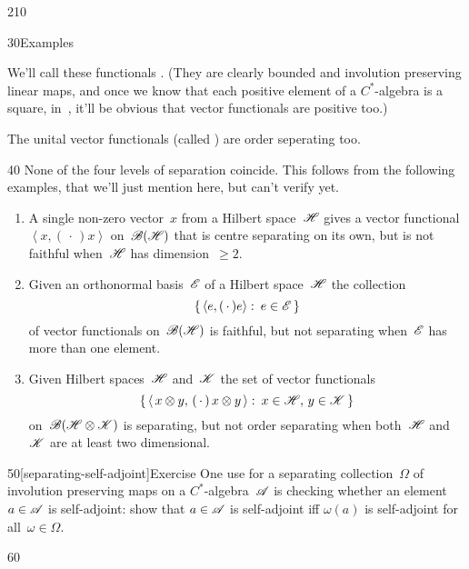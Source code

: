 \begin{parsec}{210}
\begin{point}{30}{Examples}
\begin{enumerate}
We'll call these functionals
%
%
.
(They are clearly bounded
and involution preserving linear maps,
and once we know that each positive element of a $C^*$-algebra
is a square, in~,
it'll be obvious that vector functionals
are positive too.)

The unital vector functionals (called )%
are order seperating too.
\end{enumerate}%
\spacingfix%
\begin{point}{40}
None of the four levels of separation
coincide.
This follows from the following examples,
that we'll just mention here,
but can't verify yet.
\begin{enumerate}
\item
A single non-zero vector~$x$ from a Hilbert space~$\mathscr{H}$
gives a vector functional $\left<x,(\,\cdot\,)x\right>$
on~$\mathscr{B}(\mathscr{H})$ that is centre separating
on its own, but is not faithful when~$\mathscr{H}$ has dimension~$\geq 2$.
\item
Given an orthonormal basis~$\mathscr{E}$
of a Hilbert space~$\mathscr{H}$
		the collection 
\begin{equation*}
	\{\,\left<e,(\,\cdot\,)e\right>\colon\,e\in\mathscr{E}\,\}
\end{equation*}
		of vector functionals on~$\mathscr{B}(\mathscr{H})$
		is faithful, but not separating when~$\mathscr{E}$
		has more than one element.
\item
Given Hilbert spaces~$\mathscr{H}$
and~$\mathscr{K}$
the set of vector functionals
\begin{equation*}
	\{\,\left<\,x\otimes y,\,(\,\cdot\,)\,x\otimes y\,\right>\colon\,
x\in\mathscr{H},\,y\in\mathscr{K}\,\}
\end{equation*}
on~$\mathscr{B}(\mathscr{H}\otimes\mathscr{K})$
is separating,
but not order separating
when both~$\mathscr{H}$ and~$\mathscr{K}$
are at least two dimensional.
\end{enumerate}%
\spacingfix{}%
\end{point}%
\end{point}%
\begin{point}{50}[separating-self-adjoint]{Exercise}%
One use for 
a separating collection~$\Omega$
of involution preserving maps
on a $C^*$-algebra~$\mathscr{A}$
is checking whether an element~$a\in\mathscr{A}$
is self-adjoint:
show that $a\in\mathscr{A}$ is self-adjoint
iff $\omega(a)$ is self-adjoint for all~$\omega\in\Omega$.
\end{point}
\begin{point}{60}%

\end{point}
\end{parsec}
